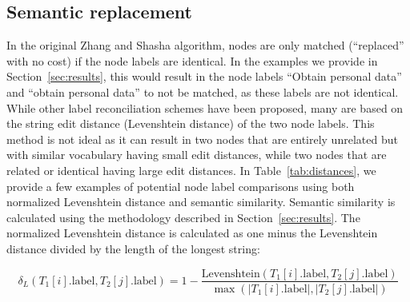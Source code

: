 \subsection{Semantic replacement}
\label{ssec:semantic-repalcement}

In the original Zhang and Shasha algorithm, nodes are only matched (``replaced'' with no cost) if the node labels are identical. In the examples we provide in Section~\ref{sec:results}, this would result in the node labels ``Obtain personal data'' and ``obtain personal data'' to not be matched, as these labels are not identical. While other label reconciliation schemes have been proposed, many are based on the string edit distance (Levenshtein distance) of the two node labels. This method is not ideal as it can result in two nodes that are entirely unrelated but with similar vocabulary having small edit distances, while two nodes that are related or identical having large edit distances. In Table~\ref{tab:distances}, we provide a few examples of potential node label comparisons using both normalized Levenshtein distance and semantic similarity. Semantic similarity is calculated using the methodology described in Section~\ref{sec:results}. The normalized Levenshtein distance is calculated as one minus the Levenshtein distance divided by the length of the longest string:

\[
    \delta_L\left(T_1[i].\text{label}, T_2[j].\text{label}\right) = 1 - \frac{\text{Levenshtein}\left(T_1[i].\text{label}, T_2[j].\text{label}\right)}{\max\left(\left|T_1[i].\text{label}\right|, \left|T_2[j].\text{label}\right|\right)}
    \]

